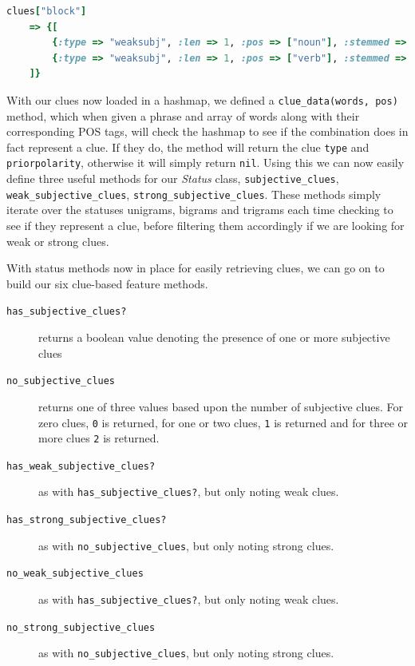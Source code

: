 \begin{lstlisting}[language=Ruby, caption={Ruby hashmap representation of listing \ref{subjectivity:clues}}, label=subjectivity:clues_hash]
clues["block"]
	=> {[
		{:type => "weaksubj", :len => 1, :pos => ["noun"], :stemmed => ["n"], :priorpolarity => "negative"},
		{:type => "weaksubj", :len => 1, :pos => ["verb"], :stemmed => ["y"], :priorpolarity => "negative"}
	]}
\end{lstlisting}

With our clues now loaded in a hashmap, we defined a \texttt{clue\-\_data(words, pos)} method, which when given a phrase and array of words along with their corresponding POS tags, will check the hashmap to see if the combination does in fact represent a clue. If they do, the method will return the clue \texttt{type} and \texttt{priorpolarity}, otherwise it will simply return \texttt{nil}. Using this we can now easily define three useful methods for our \emph{Status} class, \texttt{subjective\-\_clues}, \texttt{weak\-\_subjective\-\_clues}, \texttt{strong\-\_subjective\-\_clues}. These methods simply iterate over the statuses unigrams, bigrams and trigrams each time checking to see if they represent a clue, before filtering them accordingly if we are looking for weak or strong clues.

With status methods now in place for easily retrieving clues, we can go on to build our six clue-based feature methods.

\begin{description}
	\item [\texttt{has\_subjective\_clues?}] returns a boolean value denoting the presence of one or more subjective clues
	\item [\texttt{no\_subjective\_clues}] returns one of three values based upon the number of subjective clues. For zero clues, \texttt{0} is returned, for one or two clues, \texttt{1} is returned and for three or more clues \texttt{2} is returned.
	\item [\texttt{has\_weak\_subjective\_clues?}] as with \texttt{has\-\_subjective\-\_clues?}, but only noting weak clues.
	\item [\texttt{has\_strong\_subjective\_clues?}] as with \texttt{no\-\_subjective\-\_clues}, but only noting strong clues.
	\item [\texttt{no\_weak\_subjective\_clues}] as with \texttt{has\-\_subjective\-\_clues?}, but only noting weak clues.
	\item [\texttt{no\_strong\_subjective\_clues}] as with \texttt{no\-\_subjective\-\_clues}, but only noting strong clues.
\end{description}

